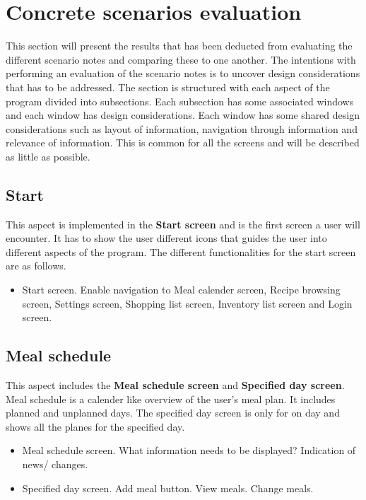 \section{Concrete scenarios evaluation}
This section will present the results that has been deducted from evaluating the different scenario notes and comparing these to one another. The intentions with performing an evaluation of the scenario notes is to uncover design considerations that has to be addressed. The section is structured with each aspect of the program divided into subsections. Each subsection has some associated windows and each window has design considerations. Each window has some shared design considerations such as layout of information, navigation through information and relevance of information. This is common for all the screens and will be described as little as possible.

\subsection{Start}
This aspect is implemented in the \textbf{Start screen} and is the first screen a user will encounter. It has to show the user different icons that guides the user into different aspects of the program. The different functionalities for the start screen are as follows.

\begin{itemize}
	\item Start screen.	
		\subitem Enable navigation to Meal calender screen, Recipe browsing screen, Settings screen, 				Shopping list screen, Inventory list screen and Login screen.
\end{itemize}

\subsection{Meal schedule}
This aspect includes the \textbf{Meal schedule screen} and \textbf{Specified day screen}. Meal schedule is a calender like overview of the user's meal plan. It includes planned and unplanned days. The specified day screen is only for on day and shows all the planes for the specified day.

\begin{itemize}
	\item Meal schedule screen.
		\subitem What information needs to be displayed? 
		\subitem Indication of news/ changes.
	\item Specified day screen.
		\subitem Add meal button.
		\subitem View meals.
		\subitem Change meals.
\end{itemize}

